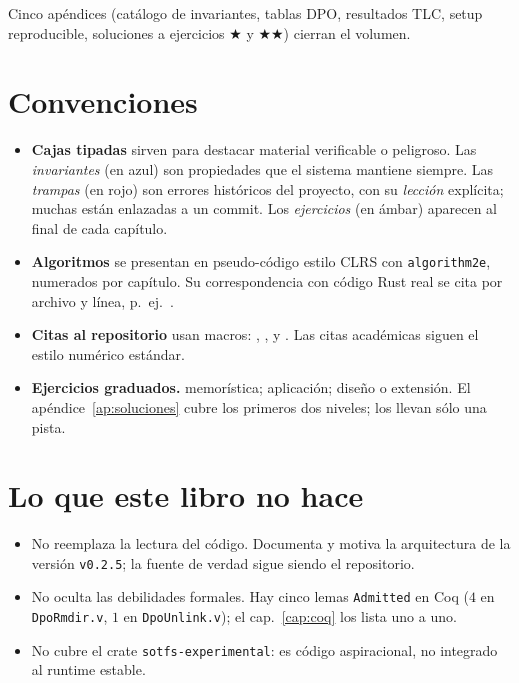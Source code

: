 Cinco apéndices (catálogo de invariantes, tablas DPO, resultados TLC,
setup reproducible, soluciones a ejercicios ★ y ★★) cierran el volumen.

\section*{Convenciones}

\begin{itemize}
  \item \textbf{Cajas tipadas} sirven para destacar material verificable o
    peligroso. Las \emph{invariantes} (en azul) son propiedades que el
    sistema mantiene siempre. Las \emph{trampas} (en rojo) son errores
    históricos del proyecto, con su \emph{lección} explícita; muchas
    están enlazadas a un commit. Los \emph{ejercicios} (en ámbar)
    aparecen al final de cada capítulo.

  \item \textbf{Algoritmos} se presentan en pseudo-código estilo CLRS con
    \texttt{algorithm2e}, numerados por capítulo. Su correspondencia
    con código Rust real se cita por archivo y línea, p.~ej.\
    .

  \item \textbf{Citas al repositorio} usan macros: ,
    \citaCoq{archivo.v}, \citaCrate{nombre} y \citaCommit{sha}. Las
    citas académicas siguen el estilo numérico estándar.

  \item \textbf{Ejercicios graduados.} \dificultad{$\star$} memorística;
    \dificultad{$\star\star$} aplicación; \dificultad{$\star\star\star$}
    diseño o extensión. El apéndice~\ref{ap:soluciones} cubre los
    primeros dos niveles; los \dificultad{$\star\star\star$} llevan
    sólo una pista.
\end{itemize}

\section*{Lo que este libro no hace}

\begin{itemize}
  \item No reemplaza la lectura del código. Documenta y motiva la
    arquitectura de la versión \texttt{v0.2.5}; la fuente de verdad
    sigue siendo el repositorio.
  \item No oculta las debilidades formales. Hay cinco lemas
    \texttt{Admitted} en Coq (\(4\) en \texttt{DpoRmdir.v}, \(1\) en
    \texttt{DpoUnlink.v}); el cap.~\ref{cap:coq} los lista uno a uno.
  \item No cubre el crate \texttt{sotfs-experimental}: es código
    aspiracional, no integrado al runtime estable.
\end{itemize}

